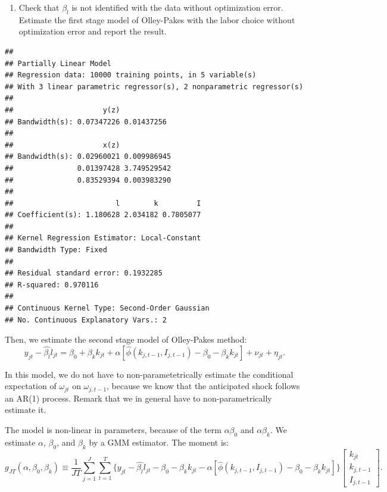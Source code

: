 \documentclass[]{book}
\providecommand{\tightlist}{%
  \setlength{\itemsep}{0pt}\setlength{\parskip}{0pt}}
\begin{document}
\begin{enumerate}
\def\labelenumi{\arabic{enumi}.}
\setcounter{enumi}{3}
\tightlist
\item
  Check that \(\beta_l\) is not identified with the data without
  optimization error. Estimate the first stage model of Olley-Pakes with
  the labor choice without optimization error and report the result.
\end{enumerate}

\begin{verbatim}
## 
## Partially Linear Model
## Regression data: 10000 training points, in 5 variable(s)
## With 3 linear parametric regressor(s), 2 nonparametric regressor(s)
## 
##                     y(z)           
## Bandwidth(s): 0.07347226 0.01437256
## 
##                     x(z)            
## Bandwidth(s): 0.02960021 0.009986945
##               0.01397428 3.749529542
##               0.83529394 0.003983290
## 
##                        l        k         I
## Coefficient(s): 1.180628 2.034182 0.7805077
## 
## Kernel Regression Estimator: Local-Constant
## Bandwidth Type: Fixed
## 
## Residual standard error: 0.1932285
## R-squared: 0.970116
## 
## Continuous Kernel Type: Second-Order Gaussian
## No. Continuous Explanatory Vars.: 2
\end{verbatim}

Then, we estimate the second stage model of Olley-Pakes method: \[
y_{jt} - \hat{\beta_l} l_{jt} = \beta_0 + \beta_k k_{jt} + \alpha[\hat{\phi}(k_{j, t - 1}, I_{j, t - 1}) - \beta_0 - \beta_k k_{jt}] + \nu_{jt} + \eta_{jt}.
\]

In this model, we do not have to non-parametetrically estimate the
conditional expectation of \(\omega_{jt}\) on \(\omega_{j, t - 1}\),
because we know that the anticipated shock follows an AR(1) process.
Remark that we in general have to non-parametrically estimate it.

The model is non-linear in parameters, because of the term
\(\alpha \beta_0\) and \(\alpha \beta_k\). We estimate \(\alpha\),
\(\beta_0\), and \(\beta_k\) by a GMM estimator. The moment is: \[
g_{JT}(\alpha, \beta_0, \beta_k) \equiv \frac{1}{JT}\sum_{j = 1}^J \sum_{t = 1}^T \{y_{jt} - \hat{\beta_l} l_{jt} - \beta_0 - \beta_k k_{jt} - \alpha[\hat{\phi}(k_{j, t - 1}, I_{j, t - 1}) - \beta_0 - \beta_k k_{jt}]\} 
\begin{bmatrix}
k_{jt} \\
k_{j, t - 1} \\
I_{j, t - 1}
\end{bmatrix}.
\]
\end{document}
